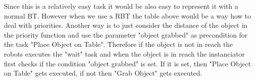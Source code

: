 \documentclass[report]{iisthesis}
\begin{document}
Since this is a relatively easy task it would be also easy to represent it with a normal BT. However when we use a RBT the table above would be a way how to deal with priorities. Another way is to just consider the distance of the object in the priority function and use the parameter "object grabbed" as precondition for the task "Place Object on Table".
Therefore if the object is not in reach the robots executes the "wait" task and when the object is in reach the instanciator first checks if the condition "object grabbed" is set. If it is set, then "Place Object on Table" gets executed, if not then "Grab Object" gets executed.

\end{document}
